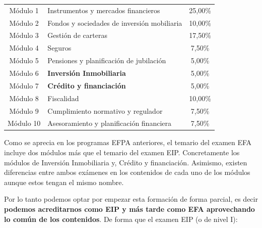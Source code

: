 \documentclass[
  letterpaper,
  DIV=11,
  numbers=noendperiod]{scrreprt}
\begin{document}
\begin{longtable}[]{@{}clc@{}}
\toprule()
\endhead
Módulo 1 & Instrumentos y mercados financieros & 25,00\% \\
Módulo 2 & Fondos y sociedades de inversión mobiliaria & 10,00\% \\
Módulo 3 & Gestión de carteras & 17,50\% \\
Módulo 4 & Seguros & 7,50\% \\
Módulo 5 & Pensiones y planificación de jubilación & 5,00\% \\
Módulo 6 & \textbf{Inversión Inmobiliaria} & 5,00\% \\
Módulo 7 & \textbf{Crédito y financiación} & 5,00\% \\
Módulo 8 & Fiscalidad & 10,00\% \\
Módulo 9 & Cumplimiento normativo y regulador & 7,50\% \\
Módulo 10 & Asesoramiento y planificación financiera & 7,50\% \\
\bottomrule()
\end{longtable}

Como se aprecia en los programas EFPA anteriores, el temario del examen
EFA incluye dos módulos más que el temario del examen EIP. Concretamente
los módulos de Inversión Inmobiliaria y, Crédito y financiación.
Asimismo, existen diferencias entre ambos exámenes en los contenidos de
cada uno de los módulos aunque estos tengan el mismo nombre.

Por lo tanto podemos optar por empezar esta formación de forma parcial,
es decir \textbf{podemos acreditarnos como EIP y más tarde como EFA
aprovechando lo común de los contenidos}. De forma que el examen EIP (o
de nivel I):
\end{document}
